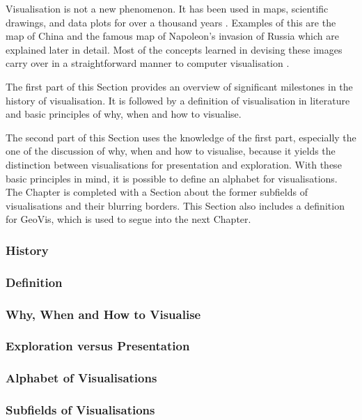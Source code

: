 Visualisation is not a new phenomenon. It has been used in maps, scientific drawings, and data plots for over a thousand years . Examples of this are the map of China and the famous map of Napoleon's invasion of Russia which are explained later in detail. Most of the concepts learned in devising these images carry over in a straightforward manner to computer visualisation .

The first part of this Section provides an overview of significant milestones in the history of visualisation. It is followed by a definition of visualisation in literature and basic principles of why, when and how to visualise.

\cbstart
The second part of this Section uses the knowledge of the first part, especially the one of the discussion of why, when and how to visualise, because it yields the distinction between visualisations for presentation and exploration. With these basic principles in mind, it is possible to define an alphabet for visualisations. The Chapter is completed with a Section about the former subfields of visualisations and their blurring borders. This Section also includes a definition for \acl{GeoVis}, which is used to segue into the next Chapter.
\cbend

\subsubsection{History}
\label{s:history}


\subsubsection{Definition}
\label{s:definition}


\subsubsection{Why, When and How to Visualise}
\label{s:basics}


\subsubsection{Exploration versus Presentation}
\label{s:eda}


\subsubsection{Alphabet of Visualisations}


\subsubsection{Subfields of Visualisations}

